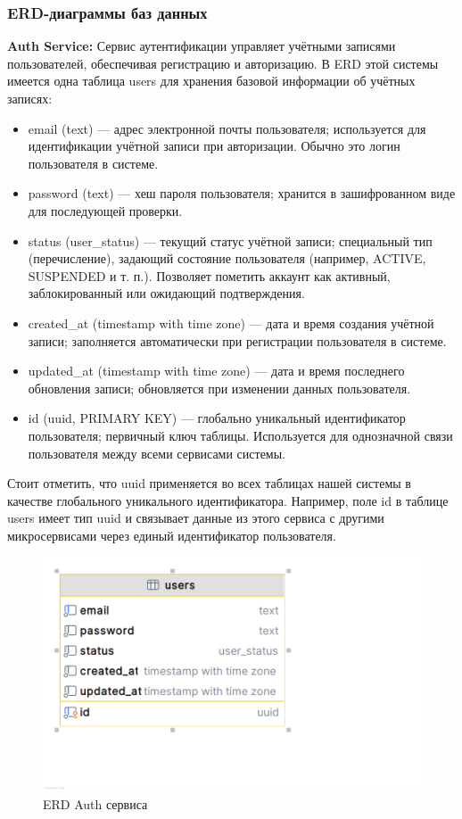\subsubsection*{ERD-диаграммы баз данных}
\textbf{Auth Service:} Сервис аутентификации управляет учётными записями пользователей, обеспечивая регистрацию и авторизацию. В ERD этой системы имеется одна таблица users для хранения базовой информации об учётных записях:
\begin{itemize}
    \item email (text) — адрес электронной почты пользователя; используется для идентификации учётной записи при авторизации. Обычно это логин пользователя в системе.
    \item password (text) — хеш пароля пользователя; хранится в зашифрованном виде для последующей проверки.
    \item status (user\_status) — текущий статус учётной записи; специальный тип (перечисление), задающий состояние пользователя (например, ACTIVE, SUSPENDED и т. п.). Позволяет пометить аккаунт как активный, заблокированный или ожидающий подтверждения.
    \item created\_at (timestamp with time zone) — дата и время создания учётной записи; заполняется автоматически при регистрации пользователя в системе.
    \item updated\_at (timestamp with time zone) — дата и время последнего обновления записи; обновляется при изменении данных пользователя.
    \item id (uuid, PRIMARY KEY) — глобально уникальный идентификатор пользователя; первичный ключ таблицы. Используется для однозначной связи пользователя между всеми сервисами системы.
\end{itemize}
Стоит отметить, что uuid применяется во всех таблицах нашей системы в качестве глобального уникального идентификатора. Например, поле id в таблице users имеет тип uuid и связывает данные из этого сервиса с другими микросервисами через единый идентификатор пользователя.
\begin{figure}[H]
        \centering
        \includegraphics[width=0.8\linewidth]{Images/second_chapter_backend_architecture/Picture10.png}
        \caption{ERD Auth сервиса}
        \label{fig:auth-service-erd}
\end{figure}

